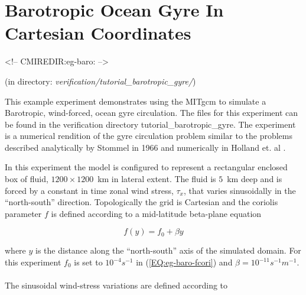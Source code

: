 

%
%

\section[Barotropic Gyre MITgcm Example]{Barotropic Ocean Gyre In Cartesian Coordinates}
\label{sect:eg-baro}
\label{www:tutorials}
\begin{rawhtml}
<!-- CMIREDIR:eg-baro: -->
\end{rawhtml}
\begin{center} 
(in directory: {\it verification/tutorial\_barotropic\_gyre/})
\end{center}

This example experiment demonstrates using the MITgcm to simulate
a Barotropic, wind-forced, ocean gyre circulation. The files for this
experiment can be found in the verification directory tutorial\_barotropic\_gyre.
The experiment is a numerical rendition of the gyre circulation problem similar
to the problems described analytically by Stommel in 1966 
\cite{Stommel66} and numerically in Holland et. al \cite{Holland75}.

In this experiment the model 
is configured to represent a rectangular enclosed box of fluid,
$1200 \times 1200 $~km in lateral extent. The fluid is $5$~km deep and is forced
by a constant in time zonal wind stress, $\tau_x$, that varies sinusoidally
in the ``north-south'' direction. Topologically the grid is Cartesian and 
the coriolis parameter $f$ is defined according to a mid-latitude beta-plane 
equation

\begin{equation}
\label{EQ:eg-baro-fcori}
f(y) = f_{0}+\beta y
\end{equation}
 
\noindent where $y$ is the distance along the ``north-south'' axis of the 
simulated domain. For this experiment $f_{0}$ is set to $10^{-4}s^{-1}$ in 
(\ref{EQ:eg-baro-fcori}) and $\beta = 10^{-11}s^{-1}m^{-1}$. 
\\
\\
 The sinusoidal wind-stress variations are defined according to 

